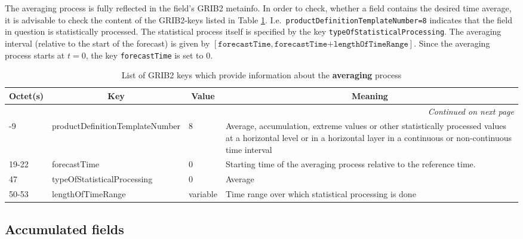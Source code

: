The averaging process is fully reflected in the field's GRIB2 metainfo. In order to check, whether a field contains the desired time average, it is 
advisable to check the content of the GRIB2-keys listed in Table \ref{tab_GRIB2avg}.
I.e.\ \texttt{productDefinitionTemplateNumber=8} indicates that the field in question is statistically processed. The statistical process itself 
is specified by the key \texttt{typeOfStatisticalProcessing}. The averaging interval (relative to the start of the forecast) is given by 
$[\texttt{forecastTime},\texttt{forecastTime+lengthOfTimeRange}]$. Since the averaging process starts at $t=0$, the key \texttt{forecastTime} 
is set to 0. 

\begin{longtable}{p{1.2cm}p{5.5cm}p{1.0cm}p{6.0cm}}
\caption[]{List of GRIB2 keys which provide information about the \textbf{averaging} process}\label{tab_GRIB2avg}\\
  \toprule
\multicolumn{1}{c}{\textbf{Octet(s)}}  &  \multicolumn{1}{c}{\textbf{Key}}  & \multicolumn{1}{c}{\textbf{Value}} & \multicolumn{1}{c}{\textbf{Meaning}} \\
\midrule
\endhead
\hline \multicolumn{4}{r}{\textit{Continued on next page}} \\
\endfoot
\endlastfoot
 8-9        &  productDefinitionTemplateNumber             &     8               &    Average, accumulation, extreme values or other statistically processed values at a horizontal level or in a horizontal layer in a continuous or non-continuous time interval   \\
 19-22      &  forecastTime                                &     0               &    Starting time of the averaging process relative to the reference time. \\
 47         &  typeOfStatisticalProcessing                 &     0               &    Average                                  \\
 50-53      &  lengthOfTimeRange                           &    variable         &    Time range over which statistical processing is done \\
\bottomrule
\end{longtable}


\subsection{Accumulated fields}

